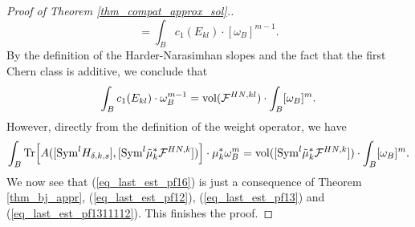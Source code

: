\documentclass[12pt]{article}
\numberwithin{equation}{section}
\theoremstyle{theorem}
\theoremstyle{definition}
\theoremstyle{remark}
\begin{document}
\begin{proof}[Proof of Theorem \ref{thm_compat_approx_sol}.]
\begin{equation}
			=
			\int_B c_1(E_{kl}) \cdot [\omega_B]^{m - 1}. 
		\end{equation}
		By the definition of the Harder-Narasimhan slopes and the fact that the first Chern class is additive, we conclude that
		\begin{equation}\label{eq_last_est_pf13}
			\int_B c_1(E_{kl}) \cdot \omega_B^{m - 1}
			=
			{\rm{vol}}(\mathcal{F}^{HN, kl}) \cdot \int_B [\omega_B]^m.
		\end{equation}
		However, directly from the definition of the weight operator, we have
		\begin{equation}\label{eq_last_est_pf1311112}
			\int_B {\rm{Tr}} \Big[ A( [{\rm{Sym}}^l H_{\delta, k, s}], [ {\rm{Sym}}^l \tilde{\mu}_k^* \mathcal{F}^{HN, k}]) \Big] \cdot \mu_k^* \omega_B^m 
			=
			{\rm{vol}}([ {\rm{Sym}}^l \tilde{\mu}_k^* \mathcal{F}^{HN, k}]) \cdot \int_B [\omega_B]^m.
		\end{equation}
		We now see that (\ref{eq_last_est_pf16}) is just a consequence of Theorem \ref{thm_bj_appr}, (\ref{eq_last_est_pf12}), (\ref{eq_last_est_pf13}) and (\ref{eq_last_est_pf1311112}).
		This finishes the proof.
	\end{proof}
	
	
	
	

	
\end{document}

